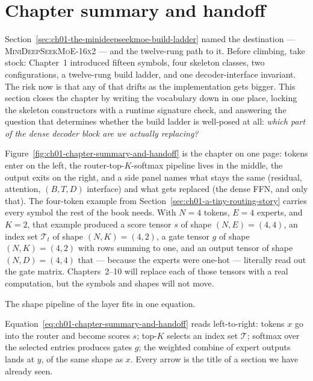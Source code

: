 \section{Chapter summary and handoff}
\label{sec:ch01-chapter-summary-and-handoff}

Section~\ref{sec:ch01-the-minideepseekmoe-build-ladder} named the destination --- \textsc{MiniDeepSeekMoE-16x2} --- and the twelve-rung path to it. Before climbing, take stock: Chapter~1 introduced fifteen symbols, four skeleton classes, two configurations, a twelve-rung build ladder, and one decoder-interface invariant. The risk now is that any of that drifts as the implementation gets bigger. This section closes the chapter by writing the vocabulary down in one place, locking the skeleton constructors with a runtime signature check, and answering the question that determines whether the build ladder is well-posed at all: \emph{which part of the dense decoder block are we actually replacing?}



Figure~\ref{fig:ch01-chapter-summary-and-handoff} is the chapter on one page: tokens enter on the left, the router-top-$K$-softmax pipeline lives in the middle, the output exits on the right, and a side panel names what stays the same (residual, attention, $(B,T,D)$ interface) and what gets replaced (the dense FFN, and only that). The four-token example from Section~\ref{sec:ch01-a-tiny-routing-story} carries every symbol the rest of the book needs. With $N = 4$ tokens, $E = 4$ experts, and $K = 2$, that example produced a score tensor $s$ of shape $(N, E) = (4, 4)$, an index set $\mathcal{T}_t$ of shape $(N, K) = (4, 2)$, a gate tensor $g$ of shape $(N, K) = (4, 2)$ with rows summing to one, and an output tensor of shape $(N, D) = (4, 4)$ that --- because the experts were one-hot --- literally read out the gate matrix. Chapters~2--10 will replace each of those tensors with a real computation, but the symbols and shapes will not move.



The shape pipeline of the layer fits in one equation.



Equation~\ref{eq:ch01-chapter-summary-and-handoff} reads left-to-right: tokens $x$ go into the router and become scores $s$; top-$K$ selects an index set $\mathcal{T}$; softmax over the selected entries produces gates $g$; the weighted combine of expert outputs lands at $y$, of the same shape as $x$. Every arrow is the title of a section we have already seen.

